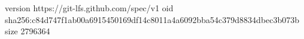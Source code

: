 version https://git-lfs.github.com/spec/v1
oid sha256:c84d747f1ab00a6915450169df14c8011a4a6092bba54c379d8834dbec3b073b
size 2796364
